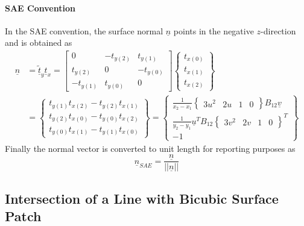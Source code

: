 \documentclass[
10pt, %
a4paper, %
oneside, %
headinclude,footinclude, %
BCOR5mm, %
]{scrartcl}
\begin{document}
\paragraph{SAE Convention}
In the SAE convention, the surface normal $\underline{n}$ points in the negative $z$-direction and is obtained as
\begin{equation}
  \begin{split}
  \underline{n} &= \underline{\tilde{t}}_y \underline{t}_x = \begin{bmatrix}
    0        & -t_{y(2)} & t_{y(1)}\\
    t_{y(2)} & 0         & -t_{y(0)}\\
    -t_{y(1)} & t_{y(0)} & 0
 \end{bmatrix}
 \begin{Bmatrix} t_{x(0)} \\ t_{x(1)} \\ t_{x(2)}  \end{Bmatrix}\\
  &= \begin{Bmatrix}
  t_{y(1)}t_{x(2)} - t_{y(2)} t_{x(1)} \\
  t_{y(2)}t_{x(0)} - t_{y(0)} t_{x(2)} \\
  t_{y(0)}t_{x(1)} - t_{y(1)} t_{x(0)}
  \end{Bmatrix} =
  \begin{Bmatrix}
     \frac{1}{x_2 - x_1} \begin{Bmatrix}3u^2 & 2u & 1 & 0\end{Bmatrix}  B_{12} \underline{v} \\
     \frac{1}{y_2 - y_1} \underline{u}^T B_{12} \begin{Bmatrix} 3v^2 & 2v & 1 & 0 \end{Bmatrix} ^T \\
    -1
  \end{Bmatrix}
\end{split}
\end{equation}
Finally the normal vector is converted to unit length for reporting purposes as
\begin{equation}
  \underline{n}_{SAE} = \frac{\underline{n}}{\lvert \lvert{\underline{n}}\rvert \rvert}
\end{equation}

\subsection{Intersection of a Line with Bicubic Surface Patch}
\end{document}
